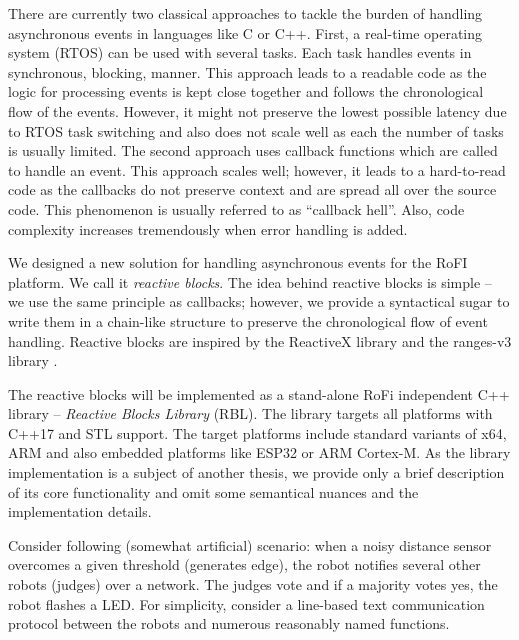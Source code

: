 There are currently two classical approaches to tackle the burden of handling
asynchronous events in languages like C or C++. First, a real-time operating
system (RTOS) can be used with several tasks. Each task handles events in
synchronous, blocking, manner. This approach leads to a readable code as the
logic for processing events is kept close together and follows the chronological
flow of the events. However, it might not preserve the lowest possible latency
due to RTOS task switching and also does not scale well as each the number of
tasks is usually limited. The second approach uses callback functions which are
called to handle an event. This approach scales well; however, it leads to a
hard-to-read code as the callbacks do not preserve context and are spread all
over the source code. This phenomenon is usually referred to as ``callback
hell''. Also, code complexity increases tremendously when error handling is
added.

We designed a new solution for handling asynchronous events for the RoFI
platform. We call it \emph{reactive blocks}. The idea behind reactive blocks is
simple -- we use the same principle as callbacks; however, we provide a
syntactical sugar to write them in a chain-like structure to preserve the
chronological flow of event handling. Reactive blocks are inspired by the
ReactiveX library \cite{noauthor_reactivex_nodate} and the ranges-v3 library
\cite{noauthor_range-v3_nodate}.

The reactive blocks will be implemented as a stand-alone RoFi independent C++
library -- \emph{Reactive Blocks Library} (RBL). The library targets all
platforms with C++17 and STL support. The target platforms include standard
variants of x64, ARM and also embedded platforms like ESP32 or ARM Cortex-M. As
the library implementation is a subject of another thesis, we provide only a
brief description of its core functionality and omit some semantical nuances and
the implementation details.

Consider following (somewhat artificial) scenario: when a noisy distance sensor
overcomes a given threshold (generates edge), the robot notifies several other
robots (judges) over a network. The judges vote and if a majority votes yes, the
robot flashes a LED. For simplicity, consider a line-based text communication
protocol between the robots and numerous reasonably named functions.

